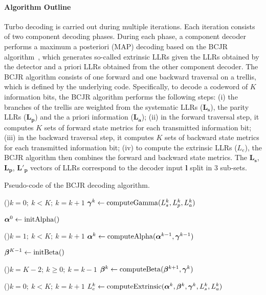 \paragraph{Algorithm Outline}

Turbo decoding is carried out during multiple iterations. Each iteration
consists of two component decoding phases. During each phase, a component
decoder performs a maximum a posteriori (MAP) decoding based on the BCJR
algorithm~\cite{Bahl1974}, which generates so-called extrinsic LLRs given the
LLRs obtained by the detector and a priori LLRs obtained from the other
component decoder. The BCJR algorithm consists of one forward and one backward
traversal on a trellis, which is defined by the underlying code. Specifically,
to decode a codeword of $K$ information bits, the BCJR algorithm performs the
following steps: (i) the branches of the trellis are weighted from the
systematic LLRs ($\bm{L_s}$), the parity LLRs ($\bm{L_p}$) and the a priori
information ($\bm{L_a}$); (ii) in the forward traversal step, it computes $K$
sets of forward state metrics for each transmitted information bit; (iii) in the
backward traversal step, it computes $K$ sets of backward state metrics for each
transmitted information bit; (iv) to compute the extrinsic LLRs ($L_e$), the
BCJR algorithm then combines the forward and backward state metrics. The
$\bm{L_s}$, $\bm{L_p}$, $\bm{L'_p}$ vectors of LLRs correspond to the decoder
input $\bm{l}$ split in 3 sub-sets.

\begin{algorithm}
  \caption{Pseudo-code of the BCJR decoding algorithm.}
  \label{alg:ctx_turbo_bcjr}

    \For(){$k=0;~k<K;~k=k+1$}
    {
      $\boldsymbol{\gamma}^k\gets \operatorname*{computeGamma}(L_{s}^k, L_{p}^k, L_{a}^k)$
    }

    $\boldsymbol{\alpha}^0\gets \operatorname*{initAlpha}()$

    \For(){$k=1;~k<K;~k=k+1$}
    {
      $\boldsymbol{\alpha}^k\gets \operatorname*{computeAlpha}(\boldsymbol{\alpha}^{k-1}, \boldsymbol{\gamma}^{k-1})$
    }

    $\boldsymbol{\beta}^{K-1}\gets \operatorname*{initBeta}()$

    \For(){$k=K-2;~k \geq 0;~k=k-1$}
    {
      $\boldsymbol{\beta}^k\gets \operatorname*{computeBeta}(\boldsymbol{\beta}^{k+1}, \boldsymbol{\gamma}^{k})$
    }

    \For(){$k=0;~k<K;~k=k+1$}
    {
      $L_e^k\gets \operatorname*{computeExtrinsic}(\boldsymbol{\alpha}^k, \boldsymbol{\beta}^{k}, \boldsymbol{\gamma}^{k}, L_{s}^k, L_{a}^k)$
    }
\end{algorithm}

